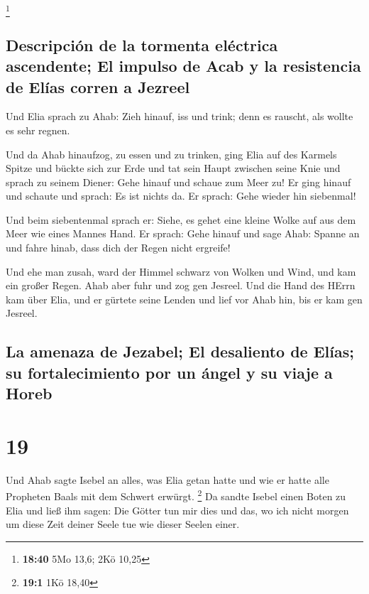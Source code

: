 \footnote{\textbf{18:40} 5Mo 13,6; 2Kö 10,25}

\hypertarget{descripciuxf3n-de-la-tormenta-eluxe9ctrica-ascendente-el-impulso-de-acab-y-la-resistencia-de-eluxedas-corren-a-jezreel}{%
\subsection{Descripción de la tormenta eléctrica ascendente; El impulso
de Acab y la resistencia de Elías corren a
Jezreel}\label{descripciuxf3n-de-la-tormenta-eluxe9ctrica-ascendente-el-impulso-de-acab-y-la-resistencia-de-eluxedas-corren-a-jezreel}}

 Und Elia sprach zu Ahab: Zieh hinauf, iss und trink;
denn es rauscht, als wollte es sehr regnen.

 Und da Ahab hinaufzog, zu essen und zu trinken, ging
Elia auf des Karmels Spitze und bückte sich zur Erde und tat sein Haupt
zwischen seine Knie  und sprach zu seinem Diener: Gehe
hinauf und schaue zum Meer zu! Er ging hinauf und schaute und sprach: Es
ist nichts da. Er sprach: Gehe wieder hin siebenmal!

 Und beim siebentenmal sprach er: Siehe, es gehet eine
kleine Wolke auf aus dem Meer wie eines Mannes Hand. Er sprach: Gehe
hinauf und sage Ahab: Spanne an und fahre hinab, dass dich der Regen
nicht ergreife!

 Und ehe man zusah, ward der Himmel schwarz von Wolken
und Wind, und kam ein großer Regen. Ahab aber fuhr und zog gen Jesreel.
 Und die Hand des HErrn kam über Elia, und er gürtete
seine Lenden und lief vor Ahab hin, bis er kam gen Jesreel.

\hypertarget{la-amenaza-de-jezabel-el-desaliento-de-eluxedas-su-fortalecimiento-por-un-uxe1ngel-y-su-viaje-a-horeb}{%
\subsection{La amenaza de Jezabel; El desaliento de Elías; su
fortalecimiento por un ángel y su viaje a
Horeb}\label{la-amenaza-de-jezabel-el-desaliento-de-eluxedas-su-fortalecimiento-por-un-uxe1ngel-y-su-viaje-a-horeb}}

\hypertarget{section-18}{%
\section{19}\label{section-18}}

 Und Ahab sagte Isebel an alles, was Elia getan hatte und
wie er hatte alle Propheten Baals mit dem Schwert erwürgt. \footnote{\textbf{19:1}
  1Kö 18,40}  Da sandte Isebel einen Boten zu Elia und
ließ ihm sagen: Die Götter tun mir dies und das, wo ich nicht morgen um
diese Zeit deiner Seele tue wie dieser Seelen einer.

